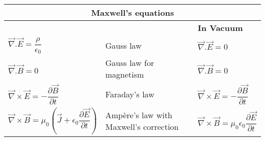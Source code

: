 \documentclass[fleqn]{article}
\begin{document}
  \begin{tabular}{ |p{5cm}|p{6cm}|p{4cm}| }
    \hline
      \multicolumn{3}{|c|}{ \textbf{Maxwell's equations}} \\
    \hline
       &  & \textbf{In Vacuum} \\
    \hline
      $\overrightarrow{\nabla}.\overrightarrow{E}=\dfrac{\rho}{\epsilon_0}$ & Gauss law & $\overrightarrow{\nabla}.\overrightarrow{E}=0$ \\
    \hline
      $\overrightarrow{\nabla}.\overrightarrow{B}=0$ & Gauss law for magnetism & $\overrightarrow{\nabla}.\overrightarrow{B}=0$ \\
    \hline
      $\overrightarrow{\nabla} \times \overrightarrow{E}=-\dfrac{\partial \overrightarrow{B}}{\partial t}$ & Faraday's law & $\overrightarrow{\nabla} \times \overrightarrow{E}=-\dfrac{\partial \overrightarrow{B}}{\partial t}$ \\
    \hline
      $\overrightarrow{\nabla} \times \overrightarrow{B}=\mu_0 \left(\overrightarrow{J}+\epsilon_0 \dfrac{\partial \overrightarrow{E}}{\partial t}\right)$ & Ampère's law with Maxwell's correction & $\overrightarrow{\nabla} \times \overrightarrow{B}=\mu_0 \epsilon_0 \dfrac{\partial \overrightarrow{E}}{\partial t}$ \\
    \hline
  \end{tabular}
\end{document}
